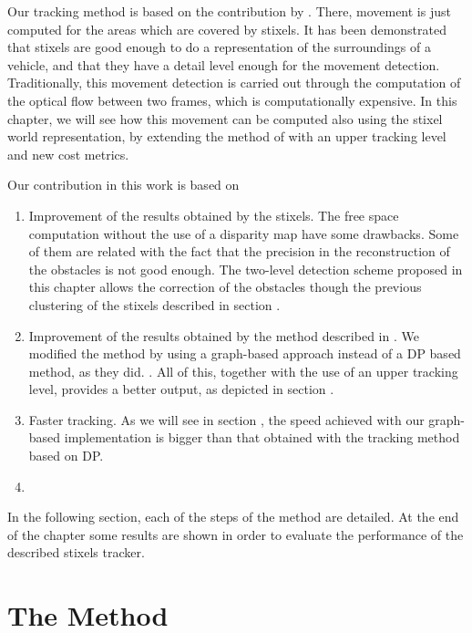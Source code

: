 Our tracking method is based on the contribution by \cite{gunyel2012stixels}. There, movement is just computed for the areas which are covered by stixels. It has been demonstrated that stixels are good enough to do a representation of the surroundings of a vehicle, and that they have a detail level enough for the movement detection. Traditionally, this movement detection is carried out through the computation of the optical flow between two frames, which is computationally expensive. In this chapter, we will see how this movement can be computed also using the stixel world representation, by extending the method of \cite{gunyel2012stixels} with an upper tracking level and new cost metrics.

Our contribution in this work is based on
\begin{enumerate}
 \item Improvement of the results obtained by the stixels. The free space computation without the use of a disparity map have some drawbacks. Some of them are related with the fact that the precision in the reconstruction of the obstacles is not good enough. The two-level detection scheme proposed in this chapter allows the correction of the obstacles though the previous clustering of the stixels described in section .
 \item Improvement of the results obtained by the method described in \cite{gunyel2012stixels}. We modified the method by using a graph-based approach instead of a \ac{DP} based method, as they did. . All of this, together with the use of an upper tracking level, provides a better output, as depicted in section .
 \item Faster tracking. As we will see in section , the speed achieved with our graph-based implementation is bigger than that obtained with the tracking method based on \ac{DP}.
 \item {}
\end{enumerate}

In the following section, each of the steps of the method are detailed. At the end of the chapter some results are shown in order to evaluate the performance of the described stixels tracker.

\section{The Method}\label{ch:chapter04_01}

